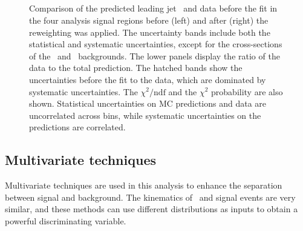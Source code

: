 \begin{figure}[htb]
    \RawFloats
    \begin{center}
     \\
       \\
      \\ 
      \\  
    \caption{Comparison of the predicted leading jet \pT\ and data before the fit in the four analysis signal regions before (left) and after (right) the reweighting was applied. The uncertainty bands include both the statistical and systematic uncertainties, except for the cross-sections of the \ttb\ and \ttc\ backgrounds.
    The lower panels display the ratio of the data to the total prediction. 
    The hatched bands show the uncertainties before the fit to the data,  which are dominated by systematic uncertainties. The $\chi^2/\mathrm{ndf}$ and the $\chi^2$ probability are also shown. Statistical uncertainties on MC predictions and data are uncorrelated across bins, while systematic uncertainties on the predictions are correlated.}
    \label{Hplustb:RWeffect}
\end{center}
\end{figure}
\clearpage
\subsection{Multivariate techniques}

Multivariate techniques are used in this analysis to enhance the separation between signal and background. The kinematics of \ttb\ and signal events are very similar, and these methods can use different distributions as inputs to obtain a powerful discriminating variable.\\

